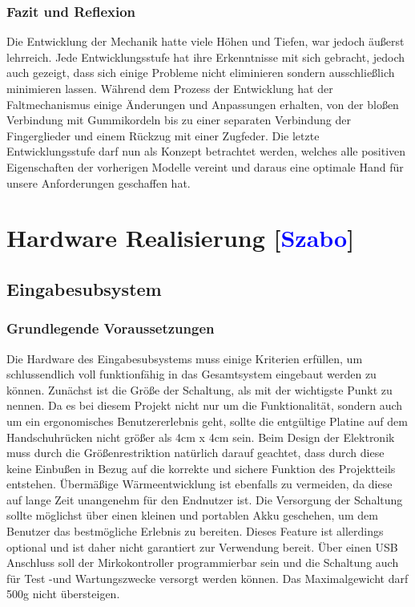 \documentclass[titlepage,12pt,twoside]{article}
\begin{document}
\subsubsection{Fazit und Reflexion}
Die Entwicklung der Mechanik hatte viele Höhen und Tiefen, war jedoch äußerst 
lehrreich. Jede Entwicklungsstufe hat ihre Erkenntnisse mit sich gebracht, jedoch 
auch gezeigt, dass sich einige Probleme nicht eliminieren sondern ausschließlich 
minimieren lassen. Während dem Prozess der Entwicklung hat der Faltmechanismus 
einige Änderungen und Anpassungen erhalten, von der bloßen Verbindung mit 
Gummikordeln bis zu einer separaten Verbindung der Fingerglieder und einem 
Rückzug mit einer Zugfeder. Die letzte Entwicklungsstufe darf nun als Konzept 
betrachtet werden, welches alle positiven Eigenschaften der vorherigen Modelle 
vereint und daraus eine optimale Hand für unsere Anforderungen geschaffen hat. \\

\newpage
\section{Hardware Realisierung  [\textcolor{blue}{Szabo}]}

\subsection{Eingabesubsystem}

\subsubsection{Grundlegende Voraussetzungen}
Die Hardware des Eingabesubsystems muss einige Kriterien erfüllen, um schlussendlich voll funktionfähig in das Gesamtsystem eingebaut 
werden zu können. Zunächst ist die Größe der Schaltung, als mit der wichtigste Punkt zu nennen. Da es bei diesem Projekt nicht nur
um die Funktionalität, sondern auch um ein ergonomisches Benutzererlebnis geht, sollte die entgültige Platine auf dem Handschuhrücken
nicht größer als 4cm x 4cm sein. Beim Design der Elektronik muss durch die Größenrestriktion natürlich darauf geachtet, dass durch
diese keine Einbußen in Bezug auf die korrekte und sichere Funktion des Projektteils entstehen. Übermäßige Wärmeentwicklung ist 
ebenfalls zu vermeiden, da diese auf lange Zeit unangenehm für den Endnutzer ist. Die Versorgung der Schaltung
sollte möglichst über einen kleinen und portablen Akku geschehen, um dem Benutzer das bestmögliche Erlebnis zu bereiten. Dieses Feature ist
allerdings optional und ist daher nicht garantiert zur Verwendung bereit. Über einen USB Anschluss soll der Mirkokontroller programmierbar sein und die Schaltung
auch für Test -und Wartungszwecke versorgt werden können. Das Maximalgewicht darf 500g nicht übersteigen. \\
\end{document}
